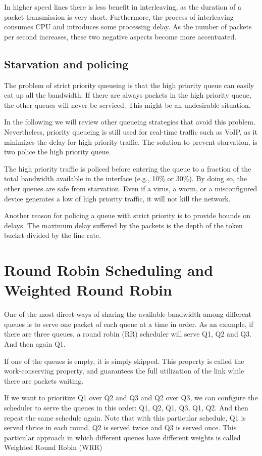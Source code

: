 In higher speed lines there is less benefit in interleaving, as the duration of a packet transmission is very short.
Furthermore, the process of interleaving consumes CPU and introduces some processing delay. 
As the number of packets per second increases, these two negative aspects become more accentuated.

\subsection{Starvation and policing}
The problem of strict priority queueing is that the high priority queue can easily eat up all the bandwidth.
If there are always packets in the high priority queue, the other queues will never be serviced.
This might be an undesirable situation.

In the following we will review other queueing strategies that avoid this problem.
Nevertheless, priority queueing is still used for real-time traffic such as VoIP, as it minimizes the delay for high priority traffic.
The solution to prevent starvation, is two police the high priority queue.

The high priority traffic is policed before entering the queue to a fraction of the total bandwidth available in the interface (e.g., 10\% or 30\%).
By doing so, the other queues are safe from starvation.
Even if a virus, a worm, or a misconfigured device generates a low of high priority traffic, it will not kill the network.

Another reason for policing a queue with strict priority is to provide bounds on delays.
The maximum delay suffered by the packets is the depth of the token bucket divided by the line rate.

\section{Round Robin Scheduling and Weighted Round Robin}

One of the most direct ways of sharing the available bandwidth among different queues is to serve one packet of each queue at a time in order.
As an example, if there are three queues, a round robin (RR) scheduler will serve Q1, Q2 and Q3.
And then again Q1.

If one of the queues is empty, it is simply skipped.
This property is called the work-conserving property, and guarantees the full utilization of the link while there are packets waiting.

If we want to prioritize Q1 over Q2 and Q3 and Q2 over Q3, we can configure the scheduler to serve the queues in this order: Q1, Q2, Q1, Q3, Q1, Q2.
And then repeat the same schedule again.
Note that with this particular schedule, Q1 is served thrice in each round, Q2 is served twice and Q3 is served once.
This particular approach in which different queues have different weights is called Weighted Round Robin (WRR)

